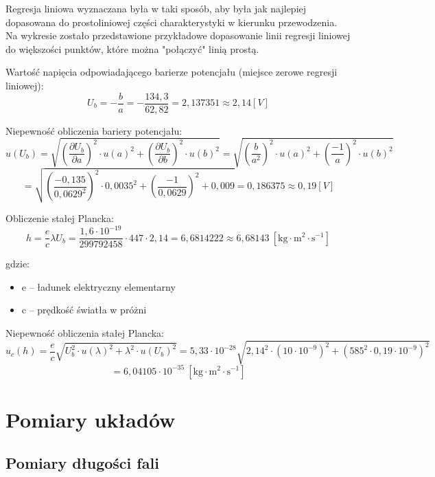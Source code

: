 \documentclass[12pt]{article}
\newcommand{\dpartial}[2]{\frac{\partial #1}{\partial #2}}
\newcommand{\physdpartial}[2]{\left( \dpartial{#1}{#2} \right)^2}
\newcommand{\powfrac}[2]{\left( \frac{#1}{#2} \right)^2}
\begin{document}
Regresja liniowa wyznaczana była w taki sposób, aby była jak najlepiej dopasowana do prostoliniowej części charakterystyki w kierunku przewodzenia.
Na wykresie zostało przedstawione przykładowe dopasowanie linii regresji liniowej do większości punktów, które można "połączyć" linią prostą.
\smallskip

Wartość napięcia odpowiadającego barierze potencjału (miejsce zerowe regresji liniowej):
\[ U_b = -\frac{b}{a} = -\frac{134,3}{62,82} = 2,137351 \approx 2,14[V] \]
\medskip

Niepewność obliczenia bariery potencjału:
\[ u(U_b) = \sqrt{ \physdpartial{U_b}{a} \cdot u(a)^2 + \physdpartial{U_b}{b} \cdot u(b)^2 } = \sqrt{ \powfrac{b}{a^2} \cdot u(a)^2 + \powfrac{-1}{a} \cdot u(b)^2 } \]
\[ = \sqrt{ \powfrac{-0,135}{0,0629^2} \cdot 0,0035^2 + \powfrac{-1}{0,0629} + 0,009 } = 0,186375 \approx 0,19[V] \]
\medskip

Obliczenie stałej Plancka:
\[ h = \frac{e}{c} \lambda U_b = \frac{1,6 \cdot 10^{-19}}{299792458} \cdot 447 \cdot 2,14 = 6,6814222 \approx 6,68143 \ [\textrm{kg} \cdot \textrm{m}^2 \cdot \textrm{s}^{-1}] \]
\medskip

gdzie:
\begin{itemize}
    \item e -- ładunek elektryczny elementarny
    \item c -- prędkość światła w próżni
\end{itemize}
\medskip

Niepewność obliczenia stałej Plancka:
\[ u_c(h) = \frac{e}{c} \sqrt{ U_b^2 \cdot u(\lambda)^2 + \lambda^2 \cdot u(U_b)^2 } = 5,33 \cdot 10^{-28} \sqrt{ 2,14^2 \cdot (10 \cdot 10^{-9})^2 + (585^2 \cdot 0,19 \cdot 10^{-9})^2 } \]
\[ = 6,04105 \cdot 10^{-35} \ [\textrm{kg} \cdot \textrm{m}^2 \cdot \textrm{s}^{-1}] \]

\pagebreak

\section{Pomiary układów}

\subsection{Pomiary długości fali}
\end{document}
